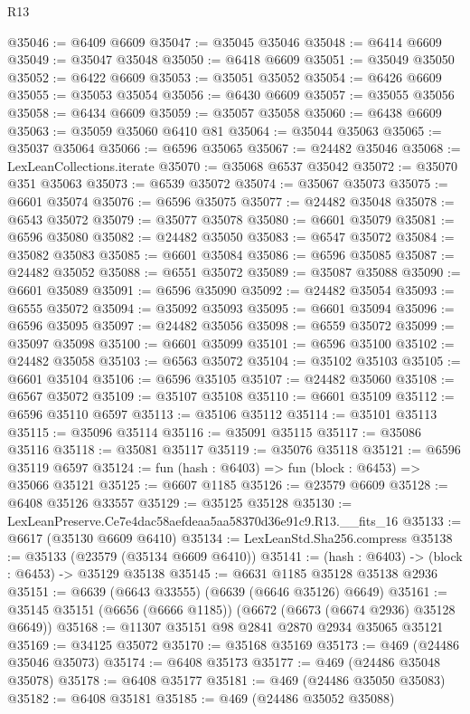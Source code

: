 \begin{lexlean}{R13}
\begin{coremodule}
@35046 := @6409 @6609
@35047 := @35045 @35046
@35048 := @6414 @6609
@35049 := @35047 @35048
@35050 := @6418 @6609
@35051 := @35049 @35050
@35052 := @6422 @6609
@35053 := @35051 @35052
@35054 := @6426 @6609
@35055 := @35053 @35054
@35056 := @6430 @6609
@35057 := @35055 @35056
@35058 := @6434 @6609
@35059 := @35057 @35058
@35060 := @6438 @6609
@35063 := @35059 @35060 @6410 @81
@35064 := @35044 @35063
@35065 := @35037 @35064
@35066 := @6596 @35065
@35067 := @24482 @35046
@35068 := LexLeanCollections.iterate
@35070 := @35068 @6537 @35042
@35072 := @35070 @351 @35063
@35073 := @6539 @35072
@35074 := @35067 @35073
@35075 := @6601 @35074
@35076 := @6596 @35075
@35077 := @24482 @35048
@35078 := @6543 @35072
@35079 := @35077 @35078
@35080 := @6601 @35079
@35081 := @6596 @35080
@35082 := @24482 @35050
@35083 := @6547 @35072
@35084 := @35082 @35083
@35085 := @6601 @35084
@35086 := @6596 @35085
@35087 := @24482 @35052
@35088 := @6551 @35072
@35089 := @35087 @35088
@35090 := @6601 @35089
@35091 := @6596 @35090
@35092 := @24482 @35054
@35093 := @6555 @35072
@35094 := @35092 @35093
@35095 := @6601 @35094
@35096 := @6596 @35095
@35097 := @24482 @35056
@35098 := @6559 @35072
@35099 := @35097 @35098
@35100 := @6601 @35099
@35101 := @6596 @35100
@35102 := @24482 @35058
@35103 := @6563 @35072
@35104 := @35102 @35103
@35105 := @6601 @35104
@35106 := @6596 @35105
@35107 := @24482 @35060
@35108 := @6567 @35072
@35109 := @35107 @35108
@35110 := @6601 @35109
@35112 := @6596 @35110 @6597
@35113 := @35106 @35112
@35114 := @35101 @35113
@35115 := @35096 @35114
@35116 := @35091 @35115
@35117 := @35086 @35116
@35118 := @35081 @35117
@35119 := @35076 @35118
@35121 := @6596 @35119 @6597
@35124 := fun (hash : @6403) => fun (block : @6453) => @35066 @35121
@35125 := @6607 @1185
@35126 := @23579 @6609
@35128 := @6408 @35126 @33557
@35129 := @35125 @35128
@35130 := LexLeanPreserve.Ce7e4dac58aefdeaa5aa58370d36e91c9.R13.__fits_16
@35133 := @6617 (@35130 @6609 @6410)
@35134 := LexLeanStd.Sha256.compress
@35138 := @35133 (@23579 (@35134 @6609 @6410))
@35141 := (hash : @6403) -> (block : @6453) -> @35129 @35138
@35145 := @6631 @1185 @35128 @35138 @2936
@35151 := @6639 (@6643 @33555) (@6639 (@6646 @35126) @6649)
@35161 := @35145 @35151 (@6656 (@6666 @1185)) (@6672 (@6673 (@6674 @2936) @35128 @6649))
@35168 := @11307 @35151 @98 @2841 @2870 @2934 @35065 @35121
@35169 := @34125 @35072
@35170 := @35168 @35169
@35173 := @469 (@24486 @35046 @35073)
@35174 := @6408 @35173
@35177 := @469 (@24486 @35048 @35078)
@35178 := @6408 @35177
@35181 := @469 (@24486 @35050 @35083)
@35182 := @6408 @35181
@35185 := @469 (@24486 @35052 @35088)

\end{coremodule}
\end{lexlean}
